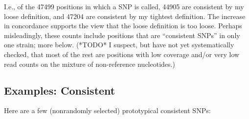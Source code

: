 \documentclass{article}\usepackage[]{graphicx}\usepackage[]{color}
\begin{document}
\noindent I.e., of the 47499 positions in which a SNP is called, 44905 are
consistent by my loose definition, and 47204 are consistent by my tightest definition.  The
increase in concordance supports the view that the loose definition is too loose.  Perhaps misleadingly, these counts
include positions that are ``consistent SNPs'' in only one strain; more below.  (*TODO* I suspect, but have not yet
systematically checked, that most of the rest are positions with low coverage and/or very low read counts on the mixture
of non-reference nucleotides.)

\subsection{Examples: Consistent}
Here are a few (nonrandomly selected) prototypical consistent SNPs:
\end{document}
